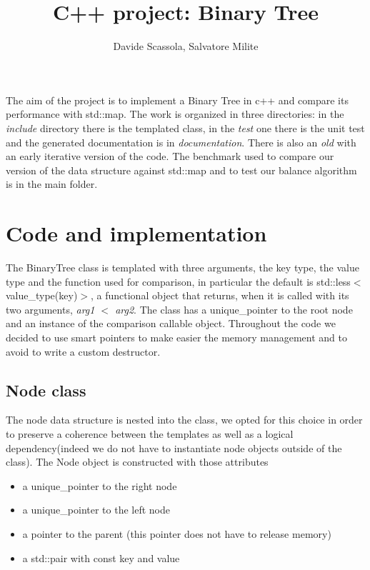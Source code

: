 \documentclass[a4paper,11pt]{article}
\title{C++ project: Binary Tree}
\author{Davide Scassola, Salvatore Milite}
\begin{document}
\maketitle

The aim of the project is to implement a Binary Tree in c++ and compare its performance with std::map. The work is organized in three directories: in the \emph{include} directory there is the templated class, in the \emph{test} one there is the unit test and the generated documentation is in \emph{documentation}. There is also an \emph{old} with an early iterative version of the code. The benchmark used to compare our version of the data structure against std::map and to test our balance algorithm is in the main folder.  


\section*{Code and implementation}

The BinaryTree class is templated with three arguments, the key type, the value type and the function used for comparison, in particular the default is std::less$<$value\_type(key)$>$, a functional object that returns, when it is called with its two arguments, \emph{arg1 $<$ arg2}. The class has a unique\_pointer to the root node and an instance of the comparison callable object. Throughout the code we decided to use smart pointers to make easier the memory management and to avoid to write a custom destructor.  

\subsection*{Node class}

The node data structure is nested into the class, we opted for this choice in order to preserve a coherence between the templates as well as a logical dependency(indeed we do not have to instantiate node objects outside of the class). The Node object is constructed with those attributes 

\begin{itemize}
\item a unique\_pointer to the right node

\item a unique\_pointer to the left node

\item a pointer to the parent (this pointer does not have to release memory)

\item a std::pair with const key and value
\end{itemize}
\end{document}
